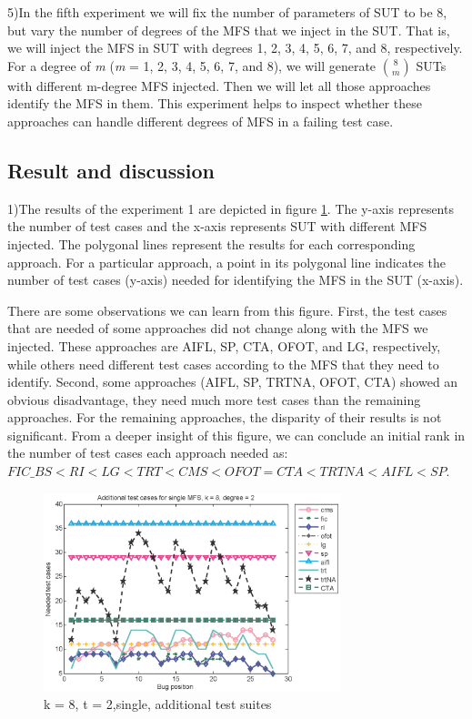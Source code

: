 \documentclass{sig-alternate-05-2015}
\begin{document}
{{{{5)In the fifth experiment we will fix the number of parameters of SUT to be 8, but vary the number of degrees of the MFS that we inject in the SUT. That is, we will inject the MFS in SUT with degrees 1, 2, 3, 4, 5, 6, 7, and 8, respectively. For a degree of \emph{m} (\emph{m} = 1, 2, 3, 4, 5, 6, 7, and 8), we will generate $\binom{8}{m}$ SUTs with different m-degree MFS injected. Then we will let all those approaches identify the MFS in them. This experiment helps to inspect whether these approaches can handle different degrees of MFS in a failing test case.

\subsection{Result and discussion}

1)The results of the experiment 1 are depicted in figure \ref{fig_single}. The y-axis represents the number of test cases and the x-axis represents SUT with different MFS injected. The polygonal lines represent the results for each corresponding approach.
For a particular approach, a point in its polygonal line indicates the number of test cases (y-axis) needed for identifying the MFS in the SUT (x-axis).

There are some observations we can learn from this figure. First, the test cases that are needed of some approaches did not change along with the MFS we injected. These approaches are AIFL, SP, CTA, OFOT, and LG, respectively, while others need different test cases according to the MFS that they need to identify. Second, some approaches (AIFL, SP, TRTNA, OFOT, CTA) showed an obvious disadvantage, they need much more test cases than the remaining approaches. For the remaining approaches, the disparity of their results is not significant. From a deeper insight of this figure, we can conclude an initial rank in the number of test cases each approach needed as:  $FIC\_BS < RI < LG < TRT < CMS < OFOT = CTA < TRTNA < AIFL < SP$.

\begin{figure}
 \centering
 \includegraphics[width=3.4in]{single.eps}
 \caption{k = 8, t = 2,single, additional test suites}
 \label{fig_single}
\end{figure}

}}}}
\end{document}

